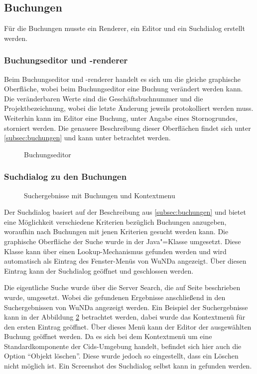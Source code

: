 \subsection{Buchungen}
Für die Buchungen musste ein Renderer, ein Editor und ein Suchdialog erstellt werden.

\subsubsection{Buchungseditor und -renderer}
Beim Buchungseditor und -renderer handelt es sich um die gleiche graphische Oberfläche, wobei beim Buchungseditor eine Buchung verändert werden kann.
Die veränderbaren Werte sind die Geschäftsbuchnummer und die Projektbezeichnung, wobei die letzte Änderung jeweils protokolliert werden muss.
Weiterhin kann im Editor eine Buchung, unter Angabe eines Stornogrundes, storniert werden.
Die genauere Beschreibung dieser Oberflächen findet sich unter \autoref{subsec:buchungen} und kann unter  betrachtet werden.

\begin{figure}[htbp]
	\centering
	\caption{Buchungseditor}
	\label{fig:buchungseditor}
\end{figure}

\subsubsection{Suchdialog zu den Buchungen}
\begin{figure}[htbp]
	\centering
	\caption{Suchergebnisse mit Buchungen und Kontextmenu}
	\label{fig:suchergebnisse}
\end{figure}

Der Suchdialog basiert auf der Beschreibung aus \autoref{subsec:buchungen} und bietet eine Möglichkeit verschiedene Kriterien bezüglich Buchungen anzugeben, woraufhin nach Buchungen mit jenen Kriterien gesucht werden kann.
Die graphische Oberfläche der Suche wurde in der Java"=Klasse  umgesetzt.
Diese Klasse kann über einen Lookup-Mechanismus gefunden werden und wird automatisch als Eintrag des Fenster-Menüs von \ac{WuNDa} angezeigt.
Über diesen Eintrag kann der Suchdialog geöffnet und geschlossen werden.

Die eigentliche Suche wurde über die Server Search, die auf Seite \pageref{subsec:serversearch} beschrieben wurde, umgesetzt.
Wobei die gefundenen Ergebnisse  anschließend in den Suchergebnissen von \ac{WuNDa} angezeigt werden.
Ein Beispiel der Suchergebnisse kann in der Abbildung \ref{fig:suchergebnisse} betrachtet werden, dabei wurde das Kontextmenü für den ersten Eintrag geöffnet.
Über dieses Menü kann der Editor der ausgewählten Buchung geöffnet werden.
Da es sich bei dem Kontextmenü um eine Standardkomponente der Cids-Umgebung handelt, befindet sich hier auch die Option "`Objekt löschen"'.
Diese wurde jedoch so eingestellt, dass ein Löschen nicht möglich ist.
Ein Screenshot des Suchdialog selbst kann in  gefunden werden.

